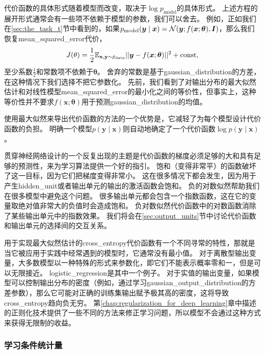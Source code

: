 代价函数的具体形式随着模型而改变，取决于$\log p_\text{model}$的具体形式。
上述方程的展开形式通常会有一些项不依赖于模型的参数，我们可以舍去。
例如，正如我们在\ref{sec:the_task_t}节中看到的，如果$p_\text{model}(\bm{y}\mid\bm{x}) = \mathcal{N}(\bm{y};f(\bm{x};\bm{\theta}), \bm{I})$，那么我们恢复\gls{mean_squared_error}代价，
\begin{equation}
J(\theta) = \frac{1}{2} \mathbb{E}_{\mathbf{x}, \mathbf{y} \sim  \hat{p}_\text{data}} || \bm{y} - f(\bm{x}; \bm{\theta}) ||^2 + \text{const},
\end{equation}
至少系数$\frac{1}{2}$和常数项不依赖于$\bm{\theta}$。
舍弃的常数是基于\gls{gaussian_distribution}的方差，在这种情况下我们选择不把它参数化。
先前，我们看到了对输出分布的最大似然估计和对线性模型\gls{mean_squared_error}的最小化之间的等价性，但事实上，这种等价性并不要求$f(\bm{x}; \bm{\theta})$用于预测\gls{gaussian_distribution}的均值。

使用最大似然来导出代价函数的方法的一个优势是，它减轻了为每个模型设计代价函数的负担。
明确一个模型$p(\bm{y}\mid\bm{x})$则自动地确定了一个代价函数$\log p(\bm{y}\mid\bm{x})$。

贯穿神经网络设计的一个反复出现的主题是代价函数的梯度必须足够的大和具有足够的预测性，来为学习算法提供一个好的指引。
饱和（变得非常平）的函数破坏了这一目标，因为它们把梯度变得非常小。
这在很多情况下都会发生，因为用于产生\gls{hidden_unit}或者输出单元的输出的激活函数会饱和。
负的对数似然帮助我们在很多模型中避免这个问题。
很多输出单元都会包含一个指数函数，这在它的变量取绝对值非常大的负值时会造成饱和。
负对数似然代价函数中的对数函数消除了某些输出单元中的指数效果。
我们将会在\ref{sec:output_units}节中讨论代价函数和输出单元的选择间的交互关系。


用于实现最大似然估计的\gls{cross_entropy}代价函数有一个不同寻常的特性，那就是当它被应用于实践中经常遇到的模型时，它通常没有最小值。
对于离散型输出变量，大多数模型以一种特殊的形式来参数化，即它们不能表示概率零和一，但是可以无限接近。
\gls{logistic_regression}是其中一个例子。
对于实值的输出变量，如果模型可以控制输出分布的密度（例如，通过学习\gls{gaussian_output_distribution}的方差参数），那么它可能对正确的训练集输出赋予极其高的密度，这将导致\gls{cross_entropy}趋向负无穷。
第\ref{chap:regularization_for_deep_learning}章中描述的正则化技术提供了一些不同的方法来修正学习问题，所以模型不会通过这种方式来获得无限制的收益。

\subsubsection{学习条件统计量}
\label{sec:learning_conditional_statistics}

